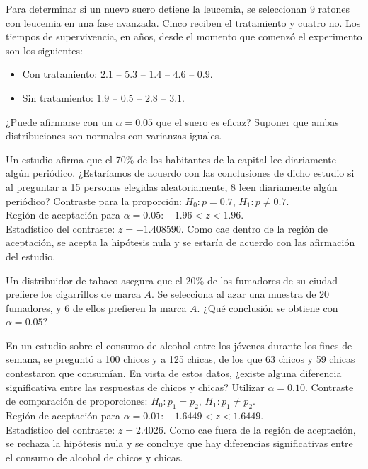 {Para determinar si un nuevo suero detiene la leucemia, se seleccionan 9 ratones con leucemia en una fase avanzada. 
Cinco reciben el tratamiento y cuatro no.
Los tiempos de supervivencia, en años, desde el momento que comenzó el experimento son los siguientes:
\begin{itemize}
\item[] Con tratamiento: $2.1$ -- $5.3$ -- $1.4$ -- $4.6$ -- $0.9$.
\item[] Sin tratamiento: $1.9$ -- $0.5$ -- $2.8$ -- $3.1$.
\end{itemize}
¿Puede afirmarse con un $\alpha=0.05$ que el suero es eficaz?
Suponer que ambas distribuciones son normales con varianzas iguales.
}
{}
{}


{Un estudio afirma que el 70\% de los habitantes de la capital lee diariamente algún periódico.
¿Estaríamos de acuerdo con las conclusiones de dicho estudio si al preguntar a 15 personas elegidas aleatoriamente, 8
leen diariamente algún periódico? }
{Contraste para la proporción: $H_0:p=0.7$, $H_1:p\neq 0.7$.\\
Región de aceptación para $\alpha=0.05$: $-1.96<z<1.96$.\\
Estadístico del contraste: $z=-1.408590$. Como cae dentro de la región de aceptación, se acepta la hipótesis nula
y se estaría de acuerdo con las afirmación del estudio.
}
{}


{Un distribuidor de tabaco asegura que el 20\% de los fumadores de su ciudad prefiere los cigarrillos de marca $A$.
Se selecciona al azar una muestra de 20 fumadores, y 6 de ellos prefieren la marca $A$.
¿Qué conclusión se obtiene con $\alpha=0.05$?
}
{}
{}


{En un estudio sobre el consumo de alcohol entre los jóvenes durante los fines de semana, se preguntó a 100 chicos y a
125 chicas, de los que 63 chicos y 59 chicas contestaron que consumían.
En vista de estos datos, ¿existe alguna diferencia significativa entre las respuestas de chicos y chicas?
Utilizar $\alpha=0.10$.
} 
{
Contraste de comparación de proporciones: $H_0:p_1=p_2$, $H_1:p_1\neq p_2$.\\
Región de aceptación para $\alpha=0.01$: $-1.6449<z<1.6449$.\\
Estadístico del contraste: $z=2.4026$. Como cae fuera de la región de aceptación, se rechaza la hipótesis nula y se
concluye que hay diferencias significativas entre el consumo de alcohol de chicos y chicas.
}
{}


